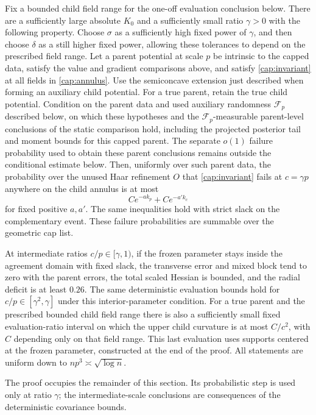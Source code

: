 \begin{proposition}\label{cap:curvature-induction}
Fix a bounded child field range for the one-off evaluation conclusion below.
There are a sufficiently large absolute $K_0$ and a sufficiently small
ratio $\gamma>0$ with the following property. Choose $\sigma$ as a
sufficiently high fixed power of $\gamma$, and then choose $\delta$ as a
still higher fixed power, allowing these tolerances to depend on the
prescribed field range. Let a parent potential at scale $p$ be intrinsic
to the capped data, satisfy the value and gradient comparisons above, and
satisfy \eqref{cap:invariant} at all fields in \eqref{cap:annulus}.
Use the semiconcave extension just described when forming an auxiliary
child potential. For a true parent, retain the true child potential.
Condition on the parent data and used auxiliary randomness
\(\mathscr F_p\) described below, on which these hypotheses and the
\(\mathscr F_p\)-measurable parent-level conclusions of the static
comparison hold, including the projected posterior tail and moment bounds
for this capped parent. The separate \(o(1)\) failure probability used to
obtain these parent conclusions remains outside the conditional estimate
below. Then,
uniformly over such parent data, the probability over the unused Haar
refinement \(O\) that \eqref{cap:invariant} fails at \(c=\gamma p\) anywhere
on the child annulus is at most
\[
 C e^{-a k_p}+C e^{-a' k_c}
\]
for fixed positive \(a,a'\). The same inequalities hold with strict slack
on the complementary event. These failure probabilities are summable over
the geometric cap list.

At intermediate ratios $c/p\in[\gamma,1)$, if the frozen parameter stays
inside the agreement domain with fixed slack, the transverse error and
mixed block tend to zero with the parent errors, the total scaled Hessian
is bounded, and the radial deficit is at least $0.26$. The same deterministic
evaluation bounds hold for $c/p\in[\gamma^2,\gamma]$ under this
interior-parameter condition. For a true parent and the prescribed bounded
child field range there is also a sufficiently small fixed evaluation-ratio
interval on which the upper child curvature is at most $C/c^2$, with $C$ depending only on
that field range. This last evaluation uses supports centered at the frozen
parameter, constructed at the end of the proof.
All statements are uniform down to $np^3\asymp\sqrt{\log n}$.
\end{proposition}
The proof occupies the remainder of this section. Its probabilistic step is
used only at ratio $\gamma$; the intermediate-scale conclusions are
consequences of the deterministic covariance bounds.

